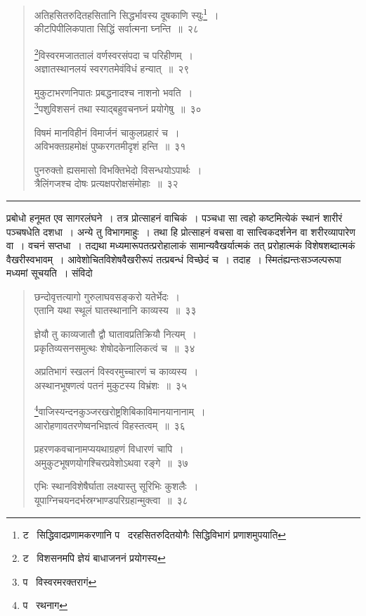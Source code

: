 \documentclass[11pt, openany]{book}
\begin{document}
\newpage

\begin{quote}
{\na अतिहसितरुदितहसितानि सिद्धर्भावस्य दूषकाणि स्युः\renewcommand{\thefootnote}{1}\footnote{ट \textendash\  सिद्धिवादप्रणामकरणानि प \textendash\  दरहसितरुदितयोगैः सिद्धिविभागं प्रणाशमुपयाति}~।\\
कीटपिपीलिकपाता सिद्धिं सर्वात्मना घ्नन्ति~॥~२८

\renewcommand{\thefootnote}{2}\footnote{ट \textendash\  विशसनमपि ज्ञेयं बाधाजननं प्रयोगस्य}विस्वरमजाततालं वर्णस्वरसंपदा च परिहीणम्~।\\
अज्ञातस्थानलयं स्वरगतमेवंविधं हन्यात्~॥~२९

मुकुटाभरणनिपातः प्रबद्धनादश्च नाशनो भवति~।\\
\renewcommand{\thefootnote}{3}\footnote{प \textendash\  विस्वरमरक्तरागं}पशुविशसनं तथा स्याद्बहुवचनघ्नं प्रयोगेषु~॥~३०

विषमं मानविहीनं विमार्जनं चाकुलप्रहारं च~।\\
अविभक्तग्रहमोक्षं पुष्करगतमीदृशं हन्ति~॥~३१

पुनरुक्तो ह्यसमासो विभक्तिभेदो विसन्धयोऽपार्थः~।\\
त्रैलिंगजश्च दोषः प्रत्यक्षपरोक्षसंमोहाः~॥~३२}
\end{quote}

\hrule

\vspace{2mm}
\noindent
प्रबोधो हनूमत एव सागरलंघने~। तत्र प्रोत्साहनं वाचिकं~। पञ्चधा सा त्वहो कष्टमित्येकं स्थानं शारीरं पञ्चषधेति दशधा~। अन्ये तु विभागमाहुः~। तथा हि प्रोत्साहनं वचसा वा सात्त्विकदर्शनेन वा शरीरव्यापारेण वा~। वचनं सप्तधा~। तद्यथा मध्यमारूपतत्प्ररोहालाकं सामान्यवैखर्यात्मकं तत् प्ररोहात्मकं विशेषशब्दात्मकं वैखरीस्वभावम्~। आवेशोचितविशेषवैखरीरूपं तत्प्रबन्धं विच्छेदं च~। तदाह~। स्मितंह्यन्तःसञ्जल्परूपा मध्यमां सूचयति~। संविदो

\newpage

\begin{quote}
{\na छन्दोवृत्तत्यागो गुरुलाघवसङ्करो यतेर्भेदः~।\\
एतानि यथा स्थूलं घातस्थानानि काव्यस्य~॥~३३

ज्ञेयौ तु काव्यजातौ द्वौ घातावप्रतिक्रियौ नित्यम्~।\\
प्रकृतिव्यसनसमुत्थः शेषोदकेनालिकत्वं च~॥~३४

अप्रतिभागं स्खलनं विस्वरमुच्चारणं च काव्यस्य~।\\
अस्थानभूषणत्वं पतनं मुकुटस्य विभ्रंशः~॥~३५

\renewcommand{\thefootnote}{1}\footnote{प \textendash\  रथनाग}वाजिस्यन्दनकुञ्जरखरोष्ट्रशिबिकाविमानयानानाम्~।\\
आरोहणावतरणेष्वनभिज्ञत्वं विहस्तत्वम्~॥~३६

प्रहरणकवचानामप्ययथाग्रहणं विधारणं चापि~।\\
अमुकुटभूषणयोगश्चिरप्रवेशोऽथवा रङ्गे~॥~३७

एभिः स्थानविशेषैर्घाता लक्ष्यास्तु सूरिभिः कुशलैः~।\\
यूपाग्निचयनदर्भस्रग्भाण्डपरिग्रहान्मुक्त्वा~॥~३८}
\end{quote}
\end{document}
